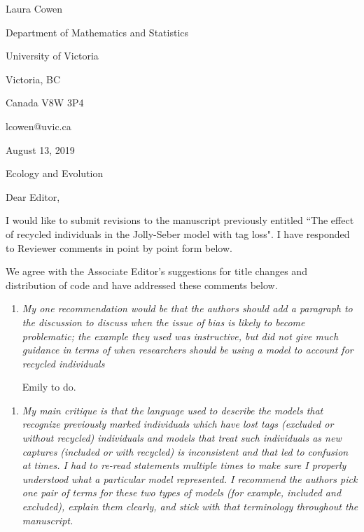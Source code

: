 \documentclass[12pt]{article}
\begin{document}
\setlength{\textheight}{575pt} \setlength{\baselineskip}{23pt}

\noindent\tiny Laura Cowen

\noindent Department of Mathematics and Statistics

\noindent University of Victoria

\noindent Victoria, BC

\noindent Canada V8W 3P4

\noindent lcowen@uvic.ca

\bigskip

\bigskip

\noindent \normalsize August 13, 2019
\bigskip





\noindent Ecology and Evolution


\bigskip


\bigskip
\noindent Dear Editor,

\bigskip

I would like to submit revisions to the manuscript previously entitled ``The effect of recycled individuals in the Jolly-Seber model with tag loss".  I have responded to Reviewer comments in point by point form below. 

\bigskip


We agree with the Associate Editor's suggestions for title changes and distribution of code and have addressed these comments below.

\bigskip

\begin{enumerate}
\item  {\it My one recommendation would be that the authors should add a paragraph to the discussion to discuss when the issue of bias is likely to become problematic;  the example they used was instructive,   but did not give much guidance in terms of when researchers should be using a model to account for recycled individuals}

Emily to do.

\end{enumerate}

\begin{enumerate}
\item  {\it My main critique is that the language used to describe the models that recognize previously marked individuals which have lost tags (excluded or without recycled) individuals and models that treat such individuals as new captures (included or with recycled) is inconsistent and that led to confusion at times. I had to re-read statements multiple times to make sure I properly understood what a particular model represented. I recommend the authors pick one pair of terms for these two types of models (for example, included and excluded), explain them clearly, and stick with that terminology throughout the manuscript.}
\end{enumerate}
\end{document}
